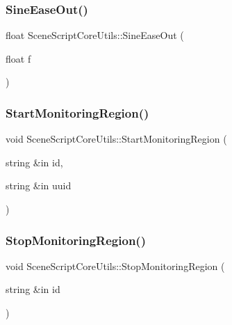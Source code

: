 \hypertarget{class_scene_script_core_utils_a154e59e013f89810615c858a98aa08cc}{}\label{class_scene_script_core_utils_a154e59e013f89810615c858a98aa08cc} 
\subsubsection{\texorpdfstring{Sine\+Ease\+Out()}{SineEaseOut()}}
{\footnotesize\ttfamily float Scene\+Script\+Core\+Utils\+::\+Sine\+Ease\+Out (\begin{DoxyParamCaption}\item[{float}]{f }\end{DoxyParamCaption})}

\hypertarget{class_scene_script_core_utils_aad71200535a5088e14caee6329d8dd4b}{}\label{class_scene_script_core_utils_aad71200535a5088e14caee6329d8dd4b} 
\subsubsection{\texorpdfstring{Start\+Monitoring\+Region()}{StartMonitoringRegion()}}
{\footnotesize\ttfamily void Scene\+Script\+Core\+Utils\+::\+Start\+Monitoring\+Region (\begin{DoxyParamCaption}\item[{string \&in}]{id,  }\item[{string \&in}]{uuid }\end{DoxyParamCaption})}

\hypertarget{class_scene_script_core_utils_a5e7fdd32a7bec0c97f8077581058890f}{}\label{class_scene_script_core_utils_a5e7fdd32a7bec0c97f8077581058890f} 
\subsubsection{\texorpdfstring{Stop\+Monitoring\+Region()}{StopMonitoringRegion()}}
{\footnotesize\ttfamily void Scene\+Script\+Core\+Utils\+::\+Stop\+Monitoring\+Region (\begin{DoxyParamCaption}\item[{string \&in}]{id }\end{DoxyParamCaption})}

